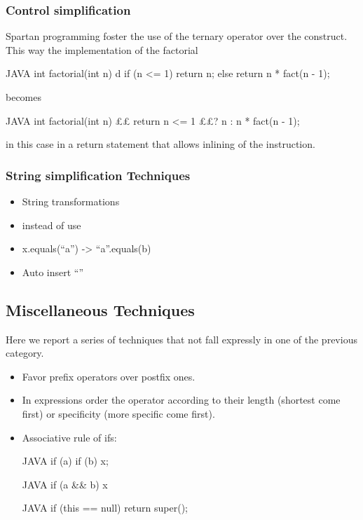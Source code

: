 \subsubsection{Control simplification}
Spartan programming foster the use of the ternary operator over the  construct.
This way the implementation of the factorial
\begin{code}{JAVA}
int factorial(int n) {d
    if (n <= 1)
        return n;
    else
        return n * fact(n - 1);
}
\end{code}
becomes
\begin{code}{JAVA}
int factorial(int n) {££
  return n <= 1 ££? n : n * fact(n - 1);
}
\end{code}

in this case in a return statement that allows inlining of the instruction.

\subsubsection{String simplification Techniques}
\begin{itemize}
 \item String transformations
 \item instead of  use 
 \item x.equals(“a”) -> “a”.equals(b)
 \item Auto insert “”
\end{itemize}

\subsection{Miscellaneous Techniques}

Here we report a series of techniques that not fall expressly in one of the
previous category.

\begin{itemize}
\item Favor prefix operators over postfix ones.
\item In expressions order the operator according to their length (shortest
  come first) or specificity (more specific come first).

\item Associative rule of ifs:
  \begin{code}{JAVA}
if (a) if (b) x;
\end{code}
  \begin{code}{JAVA}
if (a && b) x
  \end{code}
\begin{code}{JAVA}
if (this == null) return super();
\end{code}

\end{itemize}

